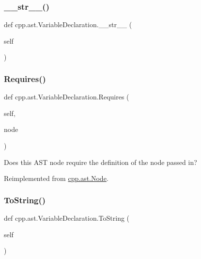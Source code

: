 \subsubsection{\texorpdfstring{\_\_str\_\_()}{\_\_str\_\_()}}
{\footnotesize\ttfamily def cpp.\+ast.\+Variable\+Declaration.\+\_\+\+\_\+str\+\_\+\+\_\+ (\begin{DoxyParamCaption}\item[{}]{self }\end{DoxyParamCaption})}

\mbox{\label{classcpp_1_1ast_1_1VariableDeclaration_aaa1cae7cf191e6d561d861cd053a0bf4}} 
\subsubsection{\texorpdfstring{Requires()}{Requires()}}
{\footnotesize\ttfamily def cpp.\+ast.\+Variable\+Declaration.\+Requires (\begin{DoxyParamCaption}\item[{}]{self,  }\item[{}]{node }\end{DoxyParamCaption})}

\begin{DoxyVerb}Does this AST node require the definition of the node passed in?\end{DoxyVerb}
 

Reimplemented from \mbox{\hyperlink{classcpp_1_1ast_1_1Node_a31ae211f954a8c578ef16226df5ac8c8}{cpp.\+ast.\+Node}}.

\mbox{\label{classcpp_1_1ast_1_1VariableDeclaration_a047aa4afddf7b7823a4095cea9477a21}} 
\subsubsection{\texorpdfstring{ToString()}{ToString()}}
{\footnotesize\ttfamily def cpp.\+ast.\+Variable\+Declaration.\+To\+String (\begin{DoxyParamCaption}\item[{}]{self }\end{DoxyParamCaption})}

